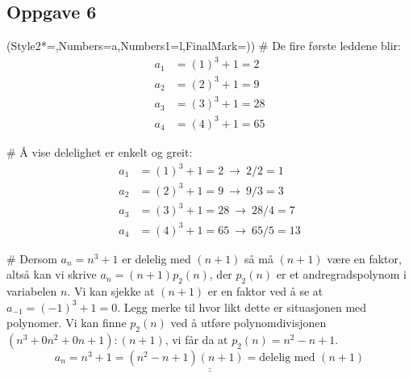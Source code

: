 \documentclass[12pt, a4paper]
{article}						%
\def\answer#1{\underline{\underline{#1}}}
\begin{document}
\subsection*{Oppgave 6}
\begin{easylist}[enumerate]
	\ListProperties(Style2*=,Numbers=a,Numbers1=l,FinalMark={)})
	# De fire første leddene blir:
	\begin{align*}
		a_1 &= (1)^3 + 1 = 2   \\
		a_2 &= (2)^3 + 1 = 9   \\
		a_3 &= (3)^3 + 1 = 28   \\
		a_4 &= (4)^3 + 1 = 65   
	\end{align*}
	
	# Å vise delelighet er enkelt og greit:
	\begin{align*}
	a_1 &= (1)^3 + 1 =2 \ \rightarrow \ 2 / 2 =1  \\
	a_2 &= (2)^3 + 1 =9 \ \rightarrow \ 9  / 3 = 3 \\
	a_3 &= (3)^3 + 1 =28 \ \rightarrow \ 28  / 4 = 7 \\
	a_4 &= (4)^3 + 1 =65 \ \rightarrow \ 65   / 5 = 13
	\end{align*}
	
	# Dersom $a_n = n^3 + 1$ er delelig med $(n+1)$ så må $(n+1)$ være en faktor,
	altså kan vi skrive $a_n = (n+1) p_2(n)$, der $p_2(n)$ er et andregradspolynom i variabelen $n$.
	Vi kan sjekke at $(n+1)$ er en faktor ved å se at $a_{-1} = (-1)^3 + 1 = 0$.
	Legg merke til hvor likt dette er situasjonen med polynomer.
	Vi kan finne $p_2(n)$ ved å utføre polynomdivisjonen $(n^3  + 0n^2 + 0n+ 1):(n+1)$, vi får da at $p_2(n) = n^2 -n + 1$.
	\begin{equation*}
		\answer{a_n = n^3 + 1 = (n^2 -n + 1)(n+1) = \text{delelig med }(n+1)}
	\end{equation*}
\end{easylist}
\end{document}
